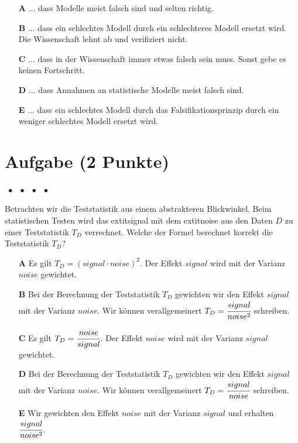 \documentclass[a4paper, 9pt]{scrartcl}\usepackage[]{graphicx}\usepackage[]{xcolor}
\begin{document}
\begin{enumerate}
\item [\textbf{A} \msquare] ... dass Modelle meist falsch sind und selten richtig.
\item [\textbf{B} \msquare] ... dass ein schlechtes Modell durch ein schlechteres Modell ersetzt wird. Die Wissenschaft lehnt ab und verifiziert nicht.
\item [\textbf{C} \msquare] ... dass in der Wissenschaft immer etwas falsch sein muss. Sonst gebe es keinen Fortschritt.
\item [\textbf{D} \msquare] ... dass Annahmen an statistische Modelle meist falsch sind.
\item [\textbf{E} \msquare] ... dass ein schlechtes Modell durch das Falsifikationsprinzip durch ein weniger schlechtes Modell ersetzt wird.
\end{enumerate}

\section{Aufgabe \hfill (2 Punkte)}

\ifcollection
\begin{flushright}
\tiny\vspace{-2Ex}
\textbf{\examinhaltstart}
\exammodulemathstat $\;\bullet$
\exammodulestat $\;\bullet$
\exammodulestatbbv $\;\bullet$
\exammodulestatversuch $\;\bullet$
\exammodulebiostat
\vspace{-1Ex}
\end{flushright}
\fi




Betrachten wir die Teststatistik aus einem abstrakteren Blickwinkel. Beim statistischen Testen wird das 	extit{signal} mit dem 	extit{noise} aus den Daten $D$ zu einer Teststatistik $T_D$ verrechnet. Welche der Formel berechnet korrekt die Teststatistik $T_D$?



\begin{enumerate}
\item [\textbf{A} \msquare] Es gilt $T_D = (signal \cdot noise)^2$. Der Effekt $signal$ wird mit der Varianz $noise$ gewichtet.
\item [\textbf{B} \msquare] Bei der Berechnung der Teststatistik $T_D$ gewichten wir den Effekt $signal$ mit der Varianz $noise$. Wir können verallgemeinert $T_D = \cfrac{signal}{noise^2}$ schreiben.
\item [\textbf{C} \msquare] Es gilt $T_D = \cfrac{noise}{signal}$. Der Effekt $noise$ wird mit der Varianz $signal$ gewichtet.
\item [\textbf{D} \msquare] Bei der Berechnung der Teststatistik $T_D$ gewichten wir den Effekt $signal$ mit der Varianz $noise$. Wir können verallgemeinert $T_D = \cfrac{signal}{noise}$ schreiben.
\item [\textbf{E} \msquare] Wir gewichten den Effekt $noise$ mit der Varianz $signal$ und erhalten $\cfrac{signal}{noise^2}$.
\end{enumerate}
\end{document}
